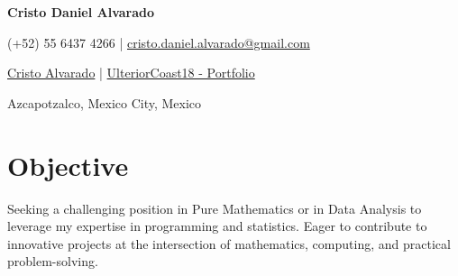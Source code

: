 \documentclass[a4paper,11pt]{article}
\newcommand{\socialicon}[1]{\raisebox{-0.05em}{\resizebox{!}{1em}{#1}}}
\newcommand{\headerfontiii}{\fontfamily{ppl}\selectfont} %
\begin{document}
\headerfontiii

\begin{center}
    {\Huge\textbf{Cristo Daniel Alvarado}}
\end{center}
\vspace{-3mm}

\begin{center}
    \small{
    (+52) 55 6437 4266 | \href{mailto:cristo.daniel.alvarado@gmail.com}{cristo.daniel.alvarado@gmail.com} %
    }
\end{center}
\vspace{-5mm}

\begin{center}
    \small{
    \socialicon{\faLinkedin} \href{www.linkedin.com/in/cristo-daniel-alvarado-2b77a7333}{Cristo Alvarado} | 
    \socialicon{\faGithub} \href{https://github.com/UlteriorCoast18/Portfolio}{UlteriorCoast18 - Portfolio} %
    }
\end{center}
\vspace{-5mm}
\begin{center}
    \small{Azcapotzalco, Mexico City, Mexico}
\end{center}

\vspace{-4mm}

\section{\textbf{Objective}}
\vspace{1mm}
\small{
Seeking a challenging position in Pure Mathematics or in Data Analysis to leverage my expertise in programming and statistics. Eager to contribute to innovative projects at the intersection of mathematics, computing, and practical problem-solving.
}
\vspace{-2mm}
\end{document}
